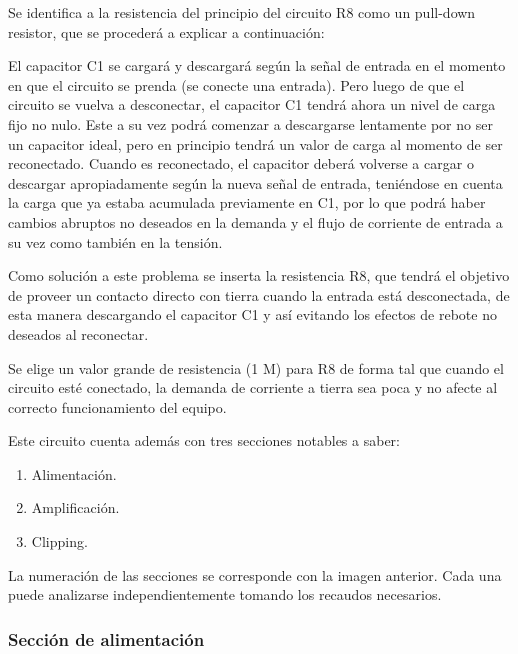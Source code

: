 \documentclass[../../main.tex]{subfiles}
\begin{document}
Se identifica a la resistencia del principio del circuito R8 como un pull-down resistor, que se procederá a explicar a continuación: \par
El capacitor C1 se cargará y descargará según la señal de entrada en el momento en que el circuito se prenda (se conecte una entrada). Pero luego de que el circuito se vuelva a desconectar, el capacitor C1 tendrá ahora un nivel de carga fijo no nulo. Este a su vez podrá comenzar a descargarse lentamente por no ser un capacitor ideal, pero en principio tendrá un valor de carga al momento de ser reconectado. Cuando es reconectado, el capacitor deberá volverse a cargar o descargar apropiadamente según la nueva señal de entrada, teniéndose en cuenta la carga que ya estaba acumulada previamente en C1, por lo que podrá haber cambios abruptos no deseados en la demanda y el flujo de corriente de entrada a su vez como también en la tensión. \par
Como solución a este problema se inserta la resistencia R8, que tendrá el objetivo de proveer un contacto directo con tierra cuando la entrada está desconectada, de esta manera descargando el capacitor C1 y así evitando los efectos de rebote no deseados al reconectar.\par
Se elige un valor grande de resistencia (1 M\ohm) para R8 de forma tal que cuando el circuito esté conectado, la demanda de corriente a tierra sea poca y no afecte al correcto funcionamiento del equipo. \par

Este circuito cuenta además con tres secciones notables a saber: 
\begin{enumerate}
\item Alimentación.
\item Amplificación.
\item Clipping.
\end{enumerate}
La numeración de las secciones se corresponde con la imagen anterior. Cada una puede analizarse independientemente tomando los recaudos necesarios.

\subsubsection{Secci\'on de alimentaci\'on}
\end{document}
